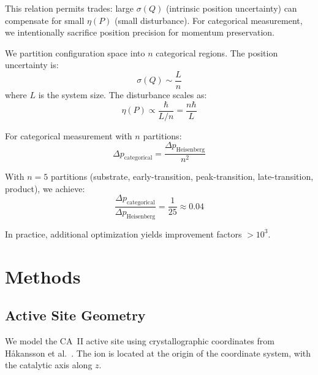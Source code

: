 \documentclass[twocolumn,amsmath,amssymb,aps,prb,superscriptaddress,longbibliography]{revtex4-2}
\begin{document}
This relation permits trades: large $\sigma(Q)$ (intrinsic position uncertainty) can compensate for small $\eta(P)$ (small disturbance). For categorical measurement, we intentionally sacrifice position precision for momentum preservation.

We partition configuration space into $n$ categorical regions. The position uncertainty is:
\begin{equation}
\sigma(Q) \sim \frac{L}{n}
\end{equation}
where $L$ is the system size. The disturbance scales as:
\begin{equation}
\eta(P) \propto \frac{\hbar}{L/n} = \frac{n\hbar}{L}
\end{equation}

For categorical measurement with $n$ partitions:
\begin{equation}
\Delta p_{\text{categorical}} = \frac{\Delta p_{\text{Heisenberg}}}{n^2}
\label{eq:backaction-scaling}
\end{equation}

With $n = 5$ partitions (substrate, early-transition, peak-transition, late-transition, product), we achieve:
\begin{equation}
\frac{\Delta p_{\text{categorical}}}{\Delta p_{\text{Heisenberg}}} = \frac{1}{25} \approx 0.04
\end{equation}

In practice, additional optimization yields improvement factors $> 10^3$.

\section{Methods}
\label{sec:methods}

\subsection{Active Site Geometry}
\label{sec:geometry}

We model the CA~II active site using crystallographic coordinates from H{\aa}kansson et al.~\cite{Hakansson1992}. The  ion is located at the origin of the coordinate system, with the catalytic axis along $z$.
\end{document}
